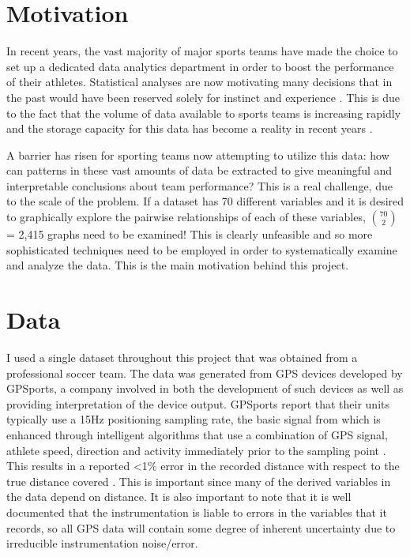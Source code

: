 \section{Motivation}
In recent years, the vast majority of major sports teams have made the choice to
set up a dedicated data analytics department in order to boost the performance
of their athletes. Statistical analyses are now motivating many decisions that in the past would have been reserved solely for instinct and experience \cite{StatsInSport}. This is due to the fact that the volume of data available to sports teams is increasing rapidly and the storage capacity for this data has become a reality in recent years \cite{GrowthOfStorageCap}.\newline

A barrier has risen for sporting teams now attempting to utilize this data: how can patterns in these vast amounts of data be extracted to give meaningful and interpretable conclusions about team performance? This is a real challenge, due to the scale of the problem. If a dataset has 70 different variables and it is desired to graphically explore the pairwise relationships of each of these variables, $\binom{70}{2}$ = 2,415 graphs need to be examined! This is clearly unfeasible and so more sophisticated techniques need to be employed in order to systematically examine and analyze the data. This is the main motivation behind this project. 

\section{Data}
I used a single dataset throughout this project that was obtained from a professional soccer team. The data was generated from GPS devices developed by GPSports, a company involved in both the development of such devices as well as providing interpretation of the device output. GPSports report that their units typically use a 15Hz positioning sampling rate, the basic signal from which is enhanced through intelligent algorithms that use a combination of GPS signal, athlete speed, direction and activity immediately prior to the sampling point \cite{tracking.pdf}. This results in a reported \textless 1\% error in the recorded distance with respect to the true distance covered \cite{tracking.pdf}. This is important since many of the derived variables in the data depend on distance. It is also important to note that it is well documented that the instrumentation is liable to errors in the variables that it records, so all GPS data will contain some degree of inherent uncertainty due to irreducible instrumentation noise/error.\newline

